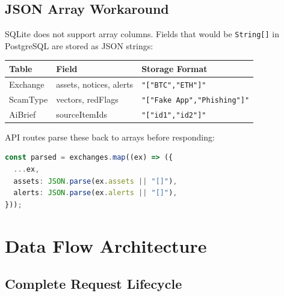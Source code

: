 \documentclass[12pt,a4paper]{article}
\begin{document}
\subsection{JSON Array Workaround}

SQLite does not support array columns. Fields that would be \texttt{String[]} in PostgreSQL are stored as JSON strings:

\begin{center}
\begin{tabular}{lll}
\toprule
\textbf{Table} & \textbf{Field} & \textbf{Storage Format} \\
\midrule
Exchange & assets, notices, alerts & \texttt{"["BTC","ETH"]"} \\
ScamType & vectors, redFlags & \texttt{"["Fake App","Phishing"]"} \\
AiBrief & sourceItemIds & \texttt{"["id1","id2"]"} \\
\bottomrule
\end{tabular}
\end{center}

API routes parse these back to arrays before responding:
\begin{lstlisting}[language=TypeScript]
const parsed = exchanges.map((ex) => ({
  ...ex,
  assets: JSON.parse(ex.assets || "[]"),
  alerts: JSON.parse(ex.alerts || "[]"),
}));
\end{lstlisting}

\newpage

\section{Data Flow Architecture}

\subsection{Complete Request Lifecycle}
\end{document}
